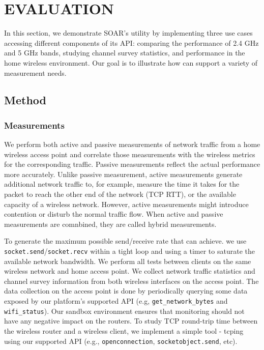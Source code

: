 \chapter{EVALUATION}
\label{sec.evaluation}
In this section, we demonstrate SOAR's utility by implementing three use cases accessing different components of its API: comparing the performance of 2.4 GHz and 5 GHz bands, studying channel survey statistics, and performance in the home wireless environment. Our goal is to illustrate how \sysname can support a variety of measurement needs.
\section{Method}
\subsection{Measurements}
\label{ssec.measurements}

We perform both active and passive measurements of network traffic from a home wireless access point and correlate those measurements with the wireless metrics for the corresponding traffic. Passive measurements reflect the actual performance more accurately. Unlike passive measurement, active measurements generate additional network traffic to, for example, measure the time it takes for the packet to reach the other end of the network (TCP RTT), or the available capacity of a wireless network. However, active measurements might introduce contention or disturb the normal traffic flow. When active and passive measurements are comnbined, they are called hybrid measurements.

To generate the maximum possible send/receive rate that \sysname can achieve. we use \texttt{socket.send}/\texttt{socket.recv} within a tight loop and using a timer to saturate the available network bandwidth. We perform all tests between clients on the same wireless network and home access point. We collect network traffic statistics and channel survey information from both wireless interfaces on the access point. The data collection on the access point is done by periodically querying some data exposed by our platform's supported API (e.g, \texttt{get\_network\_bytes} and \texttt{wifi\_status}). Our sandbox environment ensures that monitoring should not have any negative impact on the routers. To study TCP round-trip time between the wireless router and a wireless client, we implement a simple tool - tcping using our supported API (e.g., \texttt{openconnection}, \texttt{socketobject.send}, etc).

